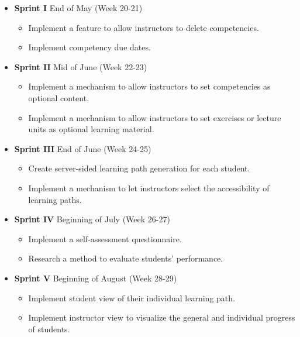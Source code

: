 \documentclass[a4paper,12pt,twoside]{article}
\begin{document}
\begin{itemize}
        \item \textbf{Sprint I} End of May (Week 20-21)
              \begin{itemize}
                      \item Implement a feature to allow instructors to delete competencies.
                      \item Implement competency due dates.
              \end{itemize}

        \item \textbf{Sprint II} Mid of June (Week 22-23)
              \begin{itemize}
                      \item Implement a mechanism to allow instructors to set competencies as optional content.
                      \item Implement a mechanism to allow instructors to set exercises or lecture units as optional learning material.
              \end{itemize}

        \item \textbf{Sprint III} End of June (Week 24-25)
              \begin{itemize}
                      \item Create server-sided learning path generation for each student.
                      \item Implement a mechanism to let instructors select the accessibility of learning paths.
              \end{itemize}

        \item \textbf{Sprint IV} Beginning of July (Week 26-27)
              \begin{itemize}
                      \item Implement a self-assessment questionnaire.
                      \item Research a method to evaluate students' performance.
              \end{itemize}

        \item \textbf{Sprint V} Beginning of August (Week 28-29)
              \begin{itemize}
                      \item Implement student view of their individual learning path.
                      \item Implement instructor view to visualize the general and individual progress of students.
              \end{itemize}


\end{itemize}
\end{document}
